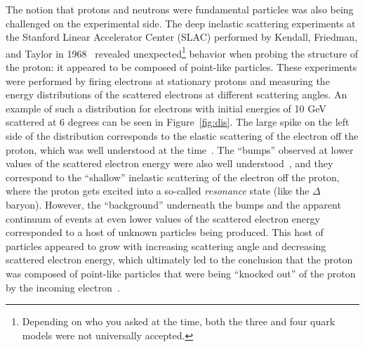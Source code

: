  The notion that protons and neutrons were fundamental particles was also being challenged on the experimental side. The deep inelastic scattering experiments at the Stanford Linear Accelerator Center (SLAC) performed by Kendall, Friedman, and Taylor in 1968~\cite{Kendall, Friedman, Taylor} revealed unexpected\footnote{Depending on who you asked at the time, both the three and four quark models were not universally accepted.} behavior when probing the structure of the proton: it appeared to be composed of point-like particles. These experiments were performed by firing electrons at stationary protons and measuring the energy distributions of the scattered electrons at different scattering angles. An example of such a distribution for electrons with initial energies of 10 GeV scattered at 6 degrees can be seen in Figure~\ref{fig:dis}. The large spike on the left side of the distribution corresponds to the elastic scattering of the electron off the proton, which was well understood at the time~\cite{ElasticScattering}. The ``bumps'' observed at lower values of the scattered electron energy were also well understood~\cite{Resonances}, and they correspond to the ``shallow'' inelastic scattering of the electron off the proton, where the proton gets excited into a so-called \textit{resonance} state (like the $\Delta$ baryon). However, the ``background'' underneath the bumps and the apparent continuum of events at even lower values of the scattered electron energy corresponded to a host of unknown particles being produced. This host of particles appeared to grow with increasing scattering angle and decreasing scattered electron energy, which ultimately led to the conclusion that the proton was composed of point-like particles that were being ``knocked out'' of the proton by the incoming electron~\cite{Kendall, BjorkenScaling}.

